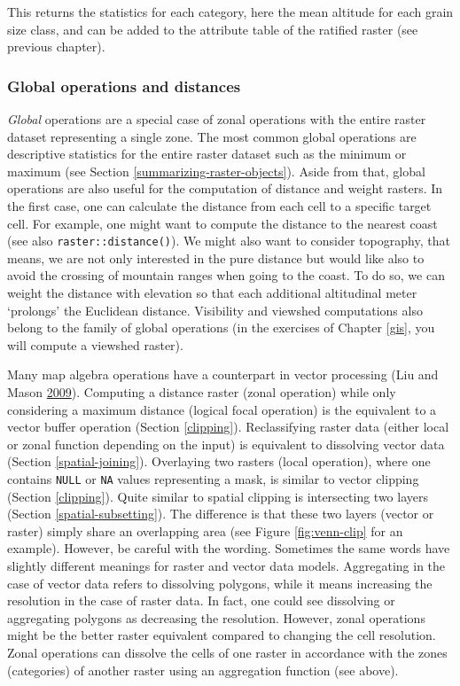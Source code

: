 \documentclass[]{krantz}
\begin{document}
This returns the statistics for each category, here the mean altitude for each grain size class, and can be added to the attribute table of the ratified raster (see previous chapter).

\hypertarget{global-operations-and-distances}{%
\subsubsection{Global operations and distances}\label{global-operations-and-distances}}

\emph{Global} operations are a special case of zonal operations with the entire raster dataset representing a single zone.
The most common global operations are descriptive statistics for the entire raster dataset such as the minimum or maximum (see Section \ref{summarizing-raster-objects}).
Aside from that, global operations are also useful for the computation of distance and weight rasters.
In the first case, one can calculate the distance from each cell to a specific target cell.
For example, one might want to compute the distance to the nearest coast (see also \texttt{raster::distance()}).
We might also want to consider topography, that means, we are not only interested in the pure distance but would like also to avoid the crossing of mountain ranges when going to the coast.
To do so, we can weight the distance with elevation so that each additional altitudinal meter `prolongs' the Euclidean distance.
Visibility and viewshed computations also belong to the family of global operations (in the exercises of Chapter \ref{gis}, you will compute a viewshed raster).

Many map algebra operations have a counterpart in vector processing (Liu and Mason \protect\hyperlink{ref-liu_essential_2009}{2009}).
Computing a distance raster (zonal operation) while only considering a maximum distance (logical focal operation) is the equivalent to a vector buffer operation (Section \ref{clipping}).
Reclassifying raster data (either local or zonal function depending on the input) is equivalent to dissolving vector data (Section \ref{spatial-joining}).
Overlaying two rasters (local operation), where one contains \texttt{NULL} or \texttt{NA} values representing a mask, is similar to vector clipping (Section \ref{clipping}).
Quite similar to spatial clipping is intersecting two layers (Section \ref{spatial-subsetting}).
The difference is that these two layers (vector or raster) simply share an overlapping area (see Figure \ref{fig:venn-clip} for an example).
However, be careful with the wording.
Sometimes the same words have slightly different meanings for raster and vector data models.
Aggregating in the case of vector data refers to dissolving polygons, while it means increasing the resolution in the case of raster data.
In fact, one could see dissolving or aggregating polygons as decreasing the resolution.
However, zonal operations might be the better raster equivalent compared to changing the cell resolution.
Zonal operations can dissolve the cells of one raster in accordance with the zones (categories) of another raster using an aggregation function (see above).
\end{document}
